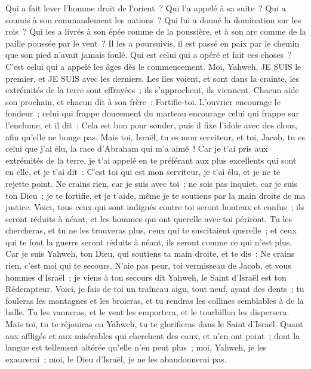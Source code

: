\begin{multicols}{2}
Qui a fait lever l'homme droit de l'orient~? Qui l'a appelé à sa suite~? Qui a soumis à son commandement les nations~? Qui lui a donné la domination sur les rois~? Qui les a livrés à son épée comme de la poussière, et à son arc comme de la paille poussée par le vent~?
Il les a poursuivis, il est passé en paix par le chemin que son pied n'avait jamais foulé.
Qui est celui qui a opéré et fait ces choses~? C'est celui qui a appelé les âges dès le commencement. Moi, Yahweh, JE SUIS le premier, et JE SUIS avec les derniers.
Les îles voient, et sont dans la crainte, les extrémités de la terre sont effrayées~; ils s'approchent, ils viennent.
Chacun aide son prochain, et chacun dit à son frère~: Fortifie-toi.
L'ouvrier encourage le fondeur~; celui qui frappe doucement du marteau encourage celui qui frappe sur l'enclume, et il dit~: Cela est bon pour souder, puis il fixe l'idole avec des clous, afin qu'elle ne bouge pas.
Mais toi, Israël, tu es mon serviteur, et toi, Jacob, tu es celui que j'ai élu, la race d'Abraham qui m'a aimé~!
Car je t'ai pris aux extrémités de la terre, je t'ai appelé en te préférant aux plus excellents qui sont en elle, et je t'ai dit~: C'est toi qui est mon serviteur, je t'ai élu, et je ne te rejette point.
Ne crains rien, car je suis avec toi~; ne sois pas inquiet, car je suis ton Dieu~; je te fortifie, et je t'aide, même je te soutiens par la main droite de ma justice.
Voici, tous ceux qui sont indignés contre toi seront honteux et confus~; ils seront réduits à néant, et les hommes qui ont querelle avec toi périront.
Tu les chercheras, et tu ne les trouveras plus, ceux qui te suscitaient querelle~; et ceux qui te font la guerre seront réduits à néant, ils seront comme ce qui n'est plus.
Car je suis Yahweh, ton Dieu, qui soutiens ta main droite, et te dis~: Ne crains rien, c'est moi qui te secours.
N’aie pas peur, toi vermisseau de Jacob, et vous hommes d’Israël~; je viens à ton secours dit Yahweh, le Saint d'Israël est ton Rédempteur.
Voici, je fais de toi un traîneau aigu, tout neuf, ayant des dents~; tu fouleras les montagnes et les broieras, et tu rendras les collines semblables à de la balle.
Tu les vanneras, et le vent les emportera, et le tourbillon les dispersera. Mais toi, tu te réjouiras en Yahweh, tu te glorifieras dans le Saint d'Israël.
Quant aux affligés et aux misérables qui cherchent des eaux, et n'en ont point~; dont la langue est tellement altérée qu'elle n'en peut plus~; moi, Yahweh, je les exaucerai~; moi, le Dieu d'Israël, je ne les abandonnerai pas.

\end{multicols}
